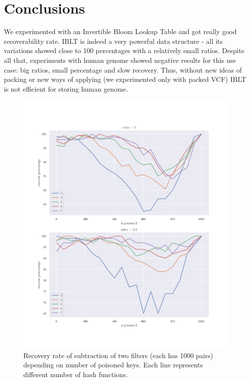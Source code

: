 \documentclass{article}
\begin{document}
\section{Conclusions}
We experimented with an Invertible Bloom Lookup Table and got really good
recoverability rate. IBLT is indeed a very powerful data structure - all its 
variations showed close to 100 percentages with a relatively small ratios. 
Despite all that, experiments with human genome showed negative results for 
this use case: big ratios, small percentage and slow recovery. Thus, without 
new ideas of packing or new ways of applying (we experimented only with packed 
VCF) IBLT is not efficient for storing human genome.
\begin{figure}[h]
\centering
\includegraphics[scale=0.75]{./poisoned50.png}
\caption{Recovery rate of subtraction of two filters (each has 1000 pairs) depending on
number of poisoned keys. Each line represents different number of hash functions.}
\end{figure}


\end{document}
